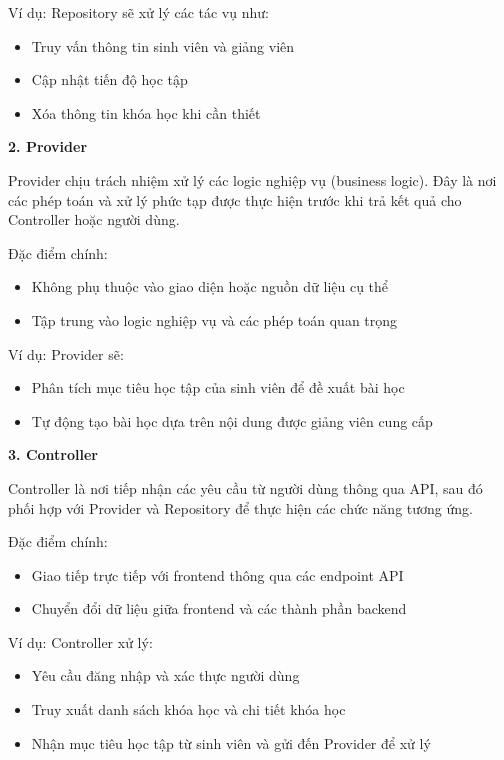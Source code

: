 Ví dụ: Repository sẽ xử lý các tác vụ như:

\begin{itemize}
    \item Truy vấn thông tin sinh viên và giảng viên
    \item Cập nhật tiến độ học tập
    \item Xóa thông tin khóa học khi cần thiết
\end{itemize}

\textbf{2. Provider} 

Provider chịu trách nhiệm xử lý các logic nghiệp vụ (business logic). Đây là nơi các phép toán và xử lý phức tạp được thực hiện trước khi trả kết quả cho Controller hoặc người dùng.

Đặc điểm chính:

\begin{itemize}
    \item Không phụ thuộc vào giao diện hoặc nguồn dữ liệu cụ thể
    \item Tập trung vào logic nghiệp vụ và các phép toán quan trọng
\end{itemize}

Ví dụ: Provider sẽ:

\begin{itemize}
    \item Phân tích mục tiêu học tập của sinh viên để đề xuất bài học
    \item Tự động tạo bài học dựa trên nội dung được giảng viên cung cấp
\end{itemize}
 
\textbf{3. Controller} 

Controller là nơi tiếp nhận các yêu cầu từ người dùng thông qua API, sau đó phối hợp với Provider và Repository để thực hiện các chức năng tương ứng.

Đặc điểm chính:

\begin{itemize}
    \item Giao tiếp trực tiếp với frontend thông qua các endpoint API
    \item Chuyển đổi dữ liệu giữa frontend và các thành phần backend
\end{itemize}

Ví dụ: Controller xử lý:

\begin{itemize}
    \item Yêu cầu đăng nhập và xác thực người dùng
    \item Truy xuất danh sách khóa học và chi tiết khóa học
    \item Nhận mục tiêu học tập từ sinh viên và gửi đến Provider để xử lý
\end{itemize}

